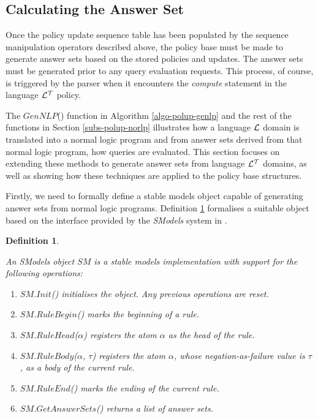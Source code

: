 \documentclass[11pt]{report}
\newtheorem{vdefinition}{Definition}[chapter]
\begin{document}
      \subsection{Calculating the Answer Set}

        Once the policy update sequence table has been populated by the
        sequence manipulation operators described above, the policy base must
        be made to generate answer sets based on the stored policies and
        updates. The answer sets must be generated prior to any query
        evaluation requests. This process, of course, is triggered by the
        parser when it encounters the {\em compute} statement in the language
        ${\cal L^T}$ policy.

        The $GenNLP$() function in Algorithm \ref{algo-polup-genlp} and the
        rest of the functions in Section \ref{subs-polup-norlp} illustrates
        how a language ${\cal L}$ domain is translated into a normal logic
        program and from answer sets derived from that normal logic program,
        how queries are evaluated. This section focuses on extending these
        methods to generate answer sets from language ${\cal L^T}$ domains, as
        well as showing how these techniques are applied to the policy base
        structures.

        Firstly, we need to formally define a stable models object capable
        of generating answer sets from normal logic programs. Definition
        \ref{defn-impln-smobj} formalises a suitable object based on the
        interface provided by the {\em SModels} system in \cite{NIE,SIM2}.

        \begin{vdefinition}
          \label{defn-impln-smobj}

          An SModels object $SM$ is a stable models implementation with
          support for the following operations:

          \begin{enumerate}
            \item
              $SM$.$Init$() initialises the object. Any previous operations are
              reset.
 
            \item
              $SM$.$RuleBegin$() marks the beginning of a rule.
 
            \item
              $SM$.$RuleHead$($\alpha$) registers the atom $\alpha$ as the
              head of the rule.
 
            \item
              $SM$.$RuleBody$($\alpha$, $\tau$) registers the atom $\alpha$,
              whose negation-as-failure value is $\tau$, as a body of the
              current rule.
 
            \item
              $SM$.$RuleEnd$() marks the ending of the current rule.
 
            \item
              $SM$.$GetAnswerSets$() returns a list of answer sets.
          \end{enumerate}
        \end{vdefinition}
\end{document}
